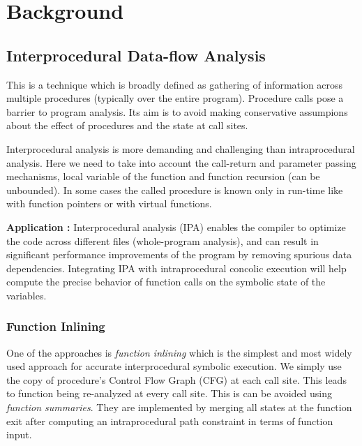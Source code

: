 \documentclass[12pt,oneside]{book}
\begin{document}

\newpage
\chapter{Background}


\section {Interprocedural Data-flow Analysis}
This is a technique which is broadly defined as gathering of information across multiple procedures (typically over the entire program). Procedure calls pose a barrier to program analysis. Its aim is to avoid making conservative assumpions about the effect of procedures and the state at call sites.

Interprocedural analysis\cite{pnueli} is more demanding and challenging than intraprocedural analysis. Here we need to take into account the call-return and parameter passing mechanisms, local variable of the function and function recursion (can be unbounded). In some cases the called procedure is known only in run-time like with function pointers or with virtual functions. 

\textbf{Application :} Interprocedural analysis (IPA) enables the compiler to optimize the code across different files (whole-program analysis), and can result in significant performance improvements of the program by removing spurious data dependencies. Integrating IPA with intraprocedural concolic execution will help compute the precise behavior of function calls on the symbolic state of the variables.


\subsection {Function Inlining}
One of the approaches is \textit{function inlining} which is the simplest and most widely used approach for accurate interprocedural symbolic execution. We simply use the copy of procedure's Control Flow Graph (CFG) at each call site. This leads to function being re-analyzed at every call site. This is can be avoided using \textit{function summaries}. They are implemented by merging all states at the function exit after computing an intraprocedural path constraint in terms of function input.\\ 
\end{document}
